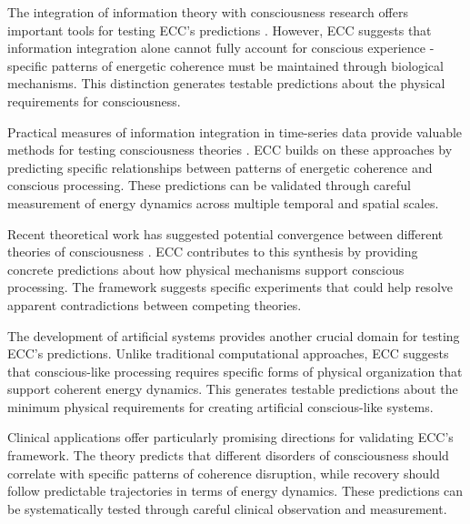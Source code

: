 The integration of information theory with consciousness research offers important tools for testing ECC's predictions \cite{Tononi2016}. However, ECC suggests that information integration alone cannot fully account for conscious experience - specific patterns of energetic coherence must be maintained through biological mechanisms. This distinction generates testable predictions about the physical requirements for consciousness.

Practical measures of information integration in time-series data provide valuable methods for testing consciousness theories \cite{Barrett2011}. ECC builds on these approaches by predicting specific relationships between patterns of energetic coherence and conscious processing. These predictions can be validated through careful measurement of energy dynamics across multiple temporal and spatial scales.

Recent theoretical work has suggested potential convergence between different theories of consciousness \cite{Northoff2020}. ECC contributes to this synthesis by providing concrete predictions about how physical mechanisms support conscious processing. The framework suggests specific experiments that could help resolve apparent contradictions between competing theories.

The development of artificial systems provides another crucial domain for testing ECC's predictions. Unlike traditional computational approaches, ECC suggests that conscious-like processing requires specific forms of physical organization that support coherent energy dynamics. This generates testable predictions about the minimum physical requirements for creating artificial conscious-like systems.

Clinical applications offer particularly promising directions for validating ECC's framework. The theory predicts that different disorders of consciousness should correlate with specific patterns of coherence disruption, while recovery should follow predictable trajectories in terms of energy dynamics. These predictions can be systematically tested through careful clinical observation and measurement.